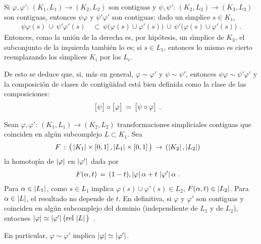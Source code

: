 \begin{obsComposicionesDeContiguasSonContiguas}%
	\label{obs:composicionesdecontiguassoncontiguas}
	Si $\varphi,\varphi':\,(K_{1},L_{1})\rightarrow (K_{2},L_{2})$
	son contiguas y
	$\psi,\psi':\,(K_{2},L_{2})\rightarrow (K_{3},L_{3})$ son contiguas,
	entonces $\psi\varphi$ y $\psi'\varphi'$ son contiguas: dado un
	s\'{\i}mplice $s\in K_{1}$,
	\begin{align*}
		\psi\varphi(s)\,\cup\,\psi'\varphi'(s) & \,\subset\,
			\psi\big(\varphi(s)\cup\varphi'(s)\big)\,\cup\,
			\psi'\big(\varphi(s)\cup\varphi'(s)\big)
		\text{ .}
	\end{align*}
	Entonces, como la uni\'{o}n de la derecha es, por hip\'{o}tesis, un
	s\'{\i}mplice de $K_{3}$, el subconjunto de la izquierda tambi\'{e}n
	lo es; si $s\in L_{1}$, entonces lo mismo es cierto reemplazando los
	s\'{\i}mplices $K_{i}$ por los $L_{i}$.

	De esto se deduce que, si, m\'{a}s en general, $\varphi\sim\varphi'$
	y $\psi\sim\psi'$, entonces $\psi\varphi\sim\psi'\varphi'$ y la
	composici\'{o}n de clases de contig\"{u}idad est\'{a} bien
	definida como la clase de las composiciones:
	\begin{align*}
		\clase{\psi}\circ\clase{\varphi} & \,=\,
			\clase{\psi\circ\varphi}
		\text{ .}
	\end{align*}
\end{obsComposicionesDeContiguasSonContiguas}

\begin{obsContiguasSonHomotopicas}\label{obs:contiguassonhomotopicas}
	Sean
	\begin{math}
		\varphi,\varphi':\,(K_{1},L_{1})\rightarrow (K_{2},L_{2})
	\end{math}
	transformaciones simpliciales contiguas que coinciden en alg\'{u}n
	subcomplejo $L\subset K_{1}$. Sea
	\begin{align*}
		F & \,:\,\big(\left|K_{1}\right|\times\left[0,1\right],
			\left|L_{1}\right|\times\left[0,1\right]\big)\,\rightarrow\,
				(\left|K_{2}\right|,\left|L_{2}\right|)
	\end{align*}
	la homotop\'{\i}a de $\left|\varphi\right|$ en $\left|\varphi'\right|$ dada por
	\begin{align*}
		F(\alpha,t) & \,=\,(1-t),\left|\varphi\right|\alpha + 
					t\,\left|\varphi'\right|\alpha
		\text{ .}
	\end{align*}
	Para $\alpha\in\left|L_{1}\right|$, como $s\in L_{1}$ implica
	$\varphi(s)\cup\varphi'(s)\in L_{2}$, $F(\alpha,t)\in\left|L_{2}\right|$.
	Para $\alpha\in\left|L\right|$, el resultado no depende de $t$. En
	definitiva, si $\varphi$ y $\varphi'$ son contiguas y coinciden en
	alg\'{u}n subcomplejo del dominio (independiente de $L_{1}$ y de
	$L_{2}$), entocnes
	\begin{math}
		\left|\varphi\right|\simeq\left|\varphi'\right|\big(\mathrm{rel}\,\left|L\right|\big)
	\end{math}~.

	En particular, $\varphi\sim\varphi'$ implica
	$\left|\varphi\right|\simeq\left|\varphi'\right|$.
\end{obsContiguasSonHomotopicas}

